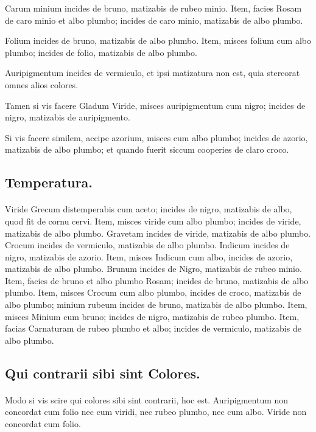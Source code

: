 \documentclass[a4paper, 11pt, oneside, polutonikogreek, italian]{article}
\begin{document}
Carum minium incides de bruno, matizabis de rubeo minio. Item, facies Rosam de caro minio et albo plumbo; incides de caro minio, matizabis de albo plumbo.

Folium incides de bruno, matizabis de albo plumbo. Item, misces folium cum albo plumbo; incides de folio, matizabis de albo plumbo.

Auripigmentum incides de vermiculo, et ipsi matizatura non est, quia stercorat omnes alios colores.

Tamen si vis facere Gladum Viride, misces auripigmentum cum nigro; incides de nigro, matizabis de auripigmento.

Si vis facere similem, accipe azorium, misces cum albo plumbo; incides de azorio, matizabis de albo plumbo; et quando fuerit siccum cooperies de claro croco.

\subsection{Temperatura.}
\paragraph{}
Viride Grecum distemperabis cum aceto; incides de nigro, matizabis de albo, quod fit de cornu cervi. Item, misces viride cum albo plumbo; incides de viride, matizabis de albo plumbo. Gravetam incides de viride, matizabis de albo plumbo. Crocum incides de vermiculo, matizabis de albo plumbo. Indicum incides de nigro, matizabis de azorio. Item, misces Indicum cum albo, incides de azorio, matizabis de albo plumbo. Brunum incides de Nigro, matizabis de rubeo minio. Item, facies de bruno et albo plumbo Rosam; incides de bruno, matizabis de albo plumbo. Item, misces Crocum cum albo plumbo, incides de croco, matizabis de albo plumbo; minium rubeum incides de bruno, matizabis de albo plumbo. Item, misces Minium cum bruno; incides de nigro, matizabis de rubeo plumbo. Item, facias Carnaturam de rubeo plumbo et albo; incides de vermiculo, matizabis de albo plumbo.

\subsection{Qui contrarii sibi sint Colores.}
\paragraph{}
Modo si vis scire qui colores sibi sint contrarii, hoc est. Auripigmentum non concordat cum folio nec cum viridi, nec rubeo plumbo, nec cum albo. Viride non concordat cum folio.
\end{document}
